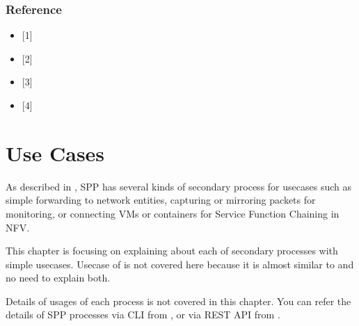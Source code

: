 \documentclass[a4paper,11pt,openany,oneside,english]{sphinxmanual}
\begin{document}
\subsection{Reference}
\label{\detokenize{gsg/performance_opt:reference}}\begin{itemize}
\item {} 
{[}1{]} 

\item {} 
{[}2{]} 

\item {} 
{[}3{]} 

\item {} 
{[}4{]} 

\end{itemize}


\chapter{Use Cases}
\label{\detokenize{usecases/index:use-cases}}\label{\detokenize{usecases/index:spp-usecases-index}}\label{\detokenize{usecases/index::doc}}
As described in {\hyperref[\detokenize{design/index:spp-design-index}]{}},
SPP has several kinds of secondary process for
usecases such as simple forwarding to network entities, capturing or
mirroring packets for monitoring, or connecting VMs or containers for
Service Function Chaining in NFV.

This chapter is focusing on explaining about each of secondary
processes with simple usecases.
Usecase of  is not covered here because it is almost
similar to  and no need to explain both.

Details of usages of each process is not covered in this chapter.
You can refer the details of SPP processes via CLI from
{\hyperref[\detokenize{commands/index:spp-commands-index}]{}},
or via REST API from {\hyperref[\detokenize{api_ref/index:spp-api-ref-index}]{}}.
\end{document}
